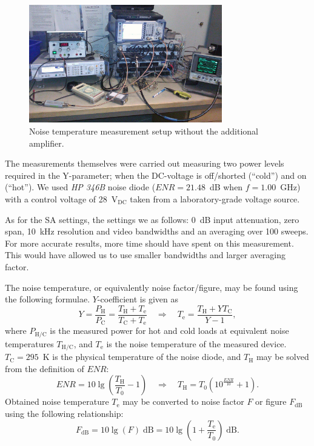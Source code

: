 \documentclass[a4paper, 12pt]{article}
\begin{document}
\begin{figure}[h!]
	\begin{center}
	\includegraphics[width=0.75\textwidth]{img/nd-ddu-sa.jpg}
	\caption{Noise temperature measurement setup without the additional amplifier.}
	\label{f:nd2}
	\end{center}
	\vspace*{-12pt}
\end{figure}

The measurements themselves were carried out measuring two power levels required in the 
Y-pa\-ram\-e\-ter; when the DC-voltage is off/shorted (``cold'') and on (``hot''). We 
used \textit{HP 346B} noise diode ($\textit{ENR} = 21.48$~dB when $f = 1.00$~GHz) with 
a control voltage of 28~V$_\mathrm{DC}$ taken from a laboratory-grade voltage source.

As for the SA settings, the settings we as follows: 0~dB input attenuation, zero span, 
10~kHz resolution and video bandwidths and an averaging over 100 sweeps. For more accurate 
results, more time should have spent on this measurement. This would have allowed us to use 
smaller bandwidths and larger averaging factor.

The noise temperature, or equivalently noise factor/figure, may be found using the following
formulae. $Y$-coefficient is given as
\begin{equation}\label{e:Y}
Y = \frac{P_\mathrm{H}}{P_\mathrm{C}} 
	= \frac{T_\mathrm{H} + T_\mathrm{e}}{T_\mathrm{C} + T_\mathrm{e}}
	\quad\Rightarrow\quad
	T_\mathrm{e} = \frac{T_\mathrm{H} + YT_\mathrm{C}}{Y - 1},
\end{equation}
where $P_\mathrm{H/C}$ is the measured power for hot and cold loads at equivalent noise 
temperatures $T_\mathrm{H/C}$, and $T_\mathrm{e}$ is the noise temperature of the measured 
device. $T_\mathrm{C} = 295$~K is the physical temperature of the noise diode, and 
$T_\mathrm{H}$ may be solved from the definition of $\textit{ENR}$:
\begin{equation}\label{e:ENR}
\mathit{ENR} = 10 \lg \left( \frac{T_\mathrm{H}}{T_\mathrm{0}} - 1 \right) 
	\quad\Rightarrow\quad
	T_\mathrm{H} = T_\mathrm{0} \left( 10^\frac{\mathit{ENR}}{10} + 1 \right).
\end{equation}
Obtained noise temperature $T_\mathrm{e}$ may be converted to noise factor $F$ or figure 
$F_\mathrm{dB}$ using the following relationship:
\begin{equation}
F_\mathrm{dB} = 10 \lg \left( F \right) \mathrm{\;dB} =  10 \lg \left( 1 + \frac{T_\mathrm{e}}{T_0} \right) \mathrm{\;dB}.
\end{equation}
\end{document}

